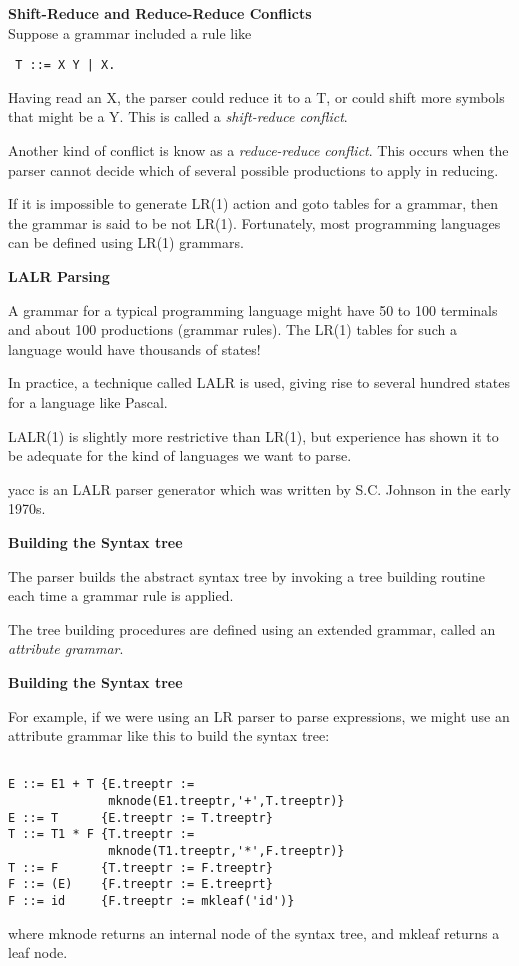 %
%
\begin{slide}{}
{\bf Shift-Reduce and Reduce-Reduce Conflicts}\\
Suppose a grammar included a rule like 
\begin{verbatim}
 T ::= X Y | X.
\end{verbatim}

Having read an X, the parser could reduce it to a T, or could shift
more symbols that might be a Y.  This is called a {\em shift-reduce conflict}.

Another kind of conflict is know as a {\em reduce-reduce conflict}.  This
occurs when the parser cannot decide which of several possible productions to
apply in reducing.

If it is impossible to generate LR(1) action and goto tables for a grammar,
then the grammar is said to be not LR(1).  Fortunately, most programming
languages can be defined using LR(1) grammars.
\end{slide}
%
%
\begin{slide}{}
{\bf LALR Parsing}

A grammar for a typical programming language might have 50 to 100
terminals and about 100 productions (grammar rules).  The LR(1)
tables for such a language would have thousands of states!

In practice, a technique called LALR is used, giving rise to several
hundred states for a language like Pascal.

LALR(1) is slightly more restrictive than LR(1), but experience has
shown it to be adequate for the kind of languages we want to parse.

yacc is an LALR parser generator which was written by S.C. Johnson
in the early 1970s.
\end{slide}
%
%
\begin{slide}{}
{\bf Building the Syntax tree}

The parser builds the abstract syntax tree by invoking
a tree building routine each time a grammar rule is
applied.

The tree building procedures are defined using an
extended grammar, called an {\em attribute grammar}.

\end{slide}
%
%
\begin{slide}{}
{\small
{\bf Building the Syntax tree}

For example, if we were using an LR parser to parse
expressions, we might use an attribute grammar like
this to build the syntax tree:
\begin{verbatim}

E ::= E1 + T {E.treeptr :=
              mknode(E1.treeptr,'+',T.treeptr)}
E ::= T      {E.treeptr := T.treeptr}
T ::= T1 * F {T.treeptr :=
              mknode(T1.treeptr,'*',F.treeptr)}
T ::= F      {T.treeptr := F.treeptr}
F ::= (E)    {F.treeptr := E.treeprt}
F ::= id     {F.treeptr := mkleaf('id')}

\end{verbatim}

where mknode returns an internal node of the syntax tree, and
mkleaf returns a leaf node.   
}
\end{slide}
